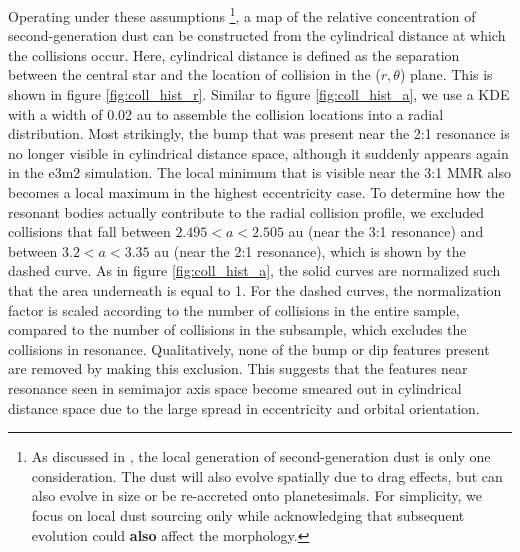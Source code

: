 Operating under these assumptions \footnote{As discussed in \cite{boley17}, the local generation of second-generation dust is 
only one consideration. The dust will also evolve spatially due to drag effects, but can also evolve in size or be re-accreted onto 
planetesimals. For simplicity, we focus on local dust sourcing only while acknowledging that subsequent evolution could 
\textbf{also} affect the morphology.}, a map of the relative concentration of second-generation dust can be constructed from the 
cylindrical distance at which the collisions occur. Here, cylindrical distance is defined as the separation between the central star 
and the location of collision in the ($r, \theta$) plane. This is shown in figure \ref{fig:coll_hist_r}. Similar to figure 
\ref{fig:coll_hist_a}, we use a KDE with a width of 0.02 au to assemble the collision locations into a radial distribution. Most 
strikingly, the bump that was present near the 2:1 resonance is no longer visible in cylindrical distance space, although it 
suddenly appears again in the e3m2 simulation. The local minimum that is visible near the 3:1 MMR also becomes a local 
maximum in the highest eccentricity case. To determine how the resonant bodies actually contribute to the radial collision profile, 
we excluded collisions that fall between $2.495 < a < 2.505$ au (near the 3:1 resonance) and between $3.2 < a < 3.35$ au (near 
the 2:1 resonance), which is shown by the dashed curve. As in figure \ref{fig:coll_hist_a}, the solid curves are normalized such 
that the area underneath is equal to 1. For the dashed curves, the normalization factor is scaled according to the number of 
collisions in the entire sample, compared to the number of collisions in the subsample, which excludes the collisions in 
resonance. Qualitatively, none of the bump or dip features present are removed by making this exclusion. This suggests that the 
features near resonance seen in semimajor axis space become smeared out in cylindrical distance space due to the large 
spread in eccentricity and orbital orientation.

